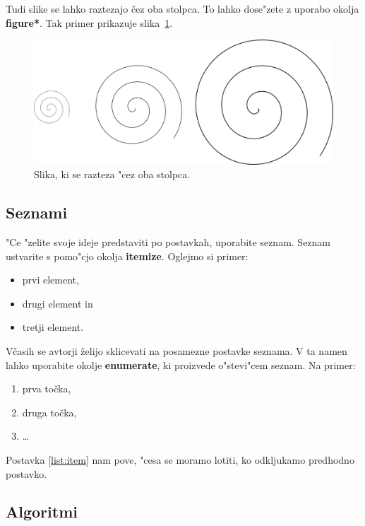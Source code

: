 \documentclass[sigconf,nonacm]{acmart}
\begin{document}
Tudi slike se lahko raztezajo čez oba stolpca.  To lahko dose"zete z uporabo
okolja \textbf{figure*}.  Tak primer prikazuje slika~\ref{fig:spin}.

\begin{figure}
    \centering
    \includegraphics[scale=0.8]{spin.png}
    \caption{Slika, ki se razteza "cez oba stolpca.}
    \label{fig:spin}
\end{figure}

\subsection{Seznami}

"Ce "zelite svoje ideje predstaviti po postavkah, uporabite seznam.  Seznam
ustvarite s pomo"cjo okolja \textbf{itemize}.  Oglejmo si primer:

\begin{itemize}
    \item prvi element,
    \item drugi element in
    \item tretji element.
\end{itemize}

Včasih se avtorji želijo sklicevati na posamezne postavke seznama.  V ta namen
lahko uporabite okolje \textbf{enumerate}, ki proizvede o"stevi"cem seznam.
Na primer:

\begin{enumerate}
    \item prva točka,
    \item\label{list:item} druga točka,
    \item \ldots
\end{enumerate}

Postavka \ref{list:item} nam pove, "cesa se moramo lotiti, ko odkljukamo
predhodno postavko.

\subsection{Algoritmi}
\end{document}
